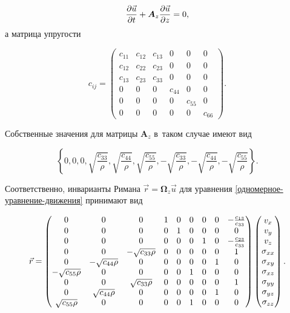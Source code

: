\documentclass[thesis.tex]{subfiles}
\begin{document}
\begin{equation}
    \label{одномерное-уравнение-движения}
    \frac{\partial{\vec u}}{\partial{t}}+\bm A_z\frac{\partial{\vec u}}{\partial{z}}=0,
\end{equation}
а матрица упругости
\begin{small}
\[
    c_{ij} = \begin{pmatrix}
        c_{11} & c_{12} & c_{13} & 0 & 0 & 0 \\
        c_{12} & c_{22} & c_{23} & 0 & 0 & 0 \\
        c_{13} & c_{23} & c_{33} & 0 & 0 & 0 \\
        0 & 0 & 0 & c_{44} & 0 & 0 \\
        0 & 0 & 0 & 0 & c_{55} & 0 \\
        0 & 0 & 0 & 0 & 0 & c_{66}
    \end{pmatrix}.
\]
\end{small}

Собственные значения для матрицы $\bm A_z$ в~таком случае имеют вид
\begin{small}
\[
    \left\{0 , 0, 0, \sqrt{\frac{c_{33}}{\rho}}, \sqrt{\frac{c_{44}}{\rho}}, \sqrt{\frac{c_{55}}{\rho}},
           -\sqrt{\frac{c_{33}}{\rho}}, -\sqrt{\frac{c_{44}}{\rho}}, -\sqrt{\frac{c_{55}}{\rho}}\right\}.
\]
\end{small}

Соответственно, инварианты Римана $\vec r  = \bm  \Omega _z \vec u$ для уравнения \eqref{одномерное-уравнение-движения}
принимают вид
\begin{small}
\begin{equation}
    \label{инварианты-римана-для-одномерного-случая}
    \vec r = \begin{pmatrix}
        0 & 0 & 0 & 1 & 0 & 0 & 0 & 0 & -\frac{c_{13}}{c_{33}} \\
        0 & 0 & 0 & 0 & 1 & 0 & 0 & 0 & 0 \\
        0 & 0 & 0 & 0 & 0 & 0 & 1 & 0 & -\frac{c_{23}}{c_{33}} \\
        0 & 0 & -\sqrt{c_{33}\rho} & 0 & 0 & 0 & 0 & 0 & 1 \\
        0 & -\sqrt{c_{44}\rho} & 0 & 0 & 0 & 0 & 0 & 1 & 0 \\
        -\sqrt{c_{55}\rho} & 0 & 0 & 0 & 0 & 1 & 0 & 0 & 0 \\
        0 & 0 & \sqrt{c_{33}\rho} & 0 & 0 & 0 & 0 & 0 & 1 \\
        0 & \sqrt{c_{44}\rho} & 0 & 0 & 0 & 0 & 0 & 1 & 0 \\
        \sqrt{c_{55}\rho} & 0 & 0 & 0 & 0 & 1 & 0 & 0 & 0
    \end{pmatrix}
    \begin{pmatrix}
        v_x \\
        v_y \\
        v_z \\
        \sigma_{xx} \\
        \sigma_{xy} \\
        \sigma_{xz} \\
        \sigma_{yy} \\
        \sigma_{yz} \\
        \sigma_{zz}
    \end{pmatrix}.
\end{equation}
\end{small}
\end{document}
